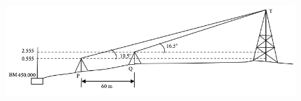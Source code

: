 \documentclass[journal]{IEEEtran}
\begin{document}
\begin{enumerate}[resume]
\begin{figure}[H]
    \centering
    \includegraphics[width=0.6\columnwidth]{figs/Q65.png} 
    \caption{}
    \label{fig:placeholder}
\end{figure}


\end{enumerate}
\end{document}
